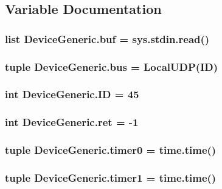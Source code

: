 \subsection{Variable Documentation}
\hypertarget{namespaceDeviceGeneric_a71165b95b92225bdd6d08b826c521c8b}{
\subsubsection[{buf}]{\setlength{\rightskip}{0pt plus 5cm}list Device\-Generic.\-buf = sys.\-stdin.\-read()}}\label{namespaceDeviceGeneric_a71165b95b92225bdd6d08b826c521c8b}
\hypertarget{namespaceDeviceGeneric_a010654b8344442fdb38cdad434bb91b6}{
\subsubsection[{bus}]{\setlength{\rightskip}{0pt plus 5cm}tuple Device\-Generic.\-bus = {\bf Local\-U\-D\-P}({\bf I\-D})}}\label{namespaceDeviceGeneric_a010654b8344442fdb38cdad434bb91b6}
\hypertarget{namespaceDeviceGeneric_a40607bde9a8451d26d9e95c719722c14}{
\subsubsection[{I\-D}]{\setlength{\rightskip}{0pt plus 5cm}int Device\-Generic.\-I\-D = 45}}\label{namespaceDeviceGeneric_a40607bde9a8451d26d9e95c719722c14}
\hypertarget{namespaceDeviceGeneric_a8c6074f36f68d72fd1c72fcb62cca169}{
\subsubsection[{ret}]{\setlength{\rightskip}{0pt plus 5cm}int Device\-Generic.\-ret = -\/1}}\label{namespaceDeviceGeneric_a8c6074f36f68d72fd1c72fcb62cca169}
\hypertarget{namespaceDeviceGeneric_abd02f36eb5b20b6fcd71492463785563}{
\subsubsection[{timer0}]{\setlength{\rightskip}{0pt plus 5cm}tuple Device\-Generic.\-timer0 = time.\-time()}}\label{namespaceDeviceGeneric_abd02f36eb5b20b6fcd71492463785563}
\hypertarget{namespaceDeviceGeneric_a8d2a2f778d4e748f1bd1b6c3d91d8a46}{
\subsubsection[{timer1}]{\setlength{\rightskip}{0pt plus 5cm}tuple Device\-Generic.\-timer1 = time.\-time()}}\label{namespaceDeviceGeneric_a8d2a2f778d4e748f1bd1b6c3d91d8a46}
